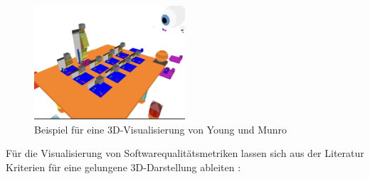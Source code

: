 \begin{figure}[h]
    \centering
    \includegraphics[width=0.5\textwidth]{images/visVRExample.png}
    \caption{Beispiel für eine 3D-Visualisierung von Young und Munro \cite[6]{visSoftwareVR}}
    \label{fig:3DVis}
\end{figure}

Für die Visualisierung von Softwarequalitätsmetriken lassen sich aus der Literatur Kriterien für eine gelungene 3D-Darstellung ableiten \cite{visSoftwareVR}:
